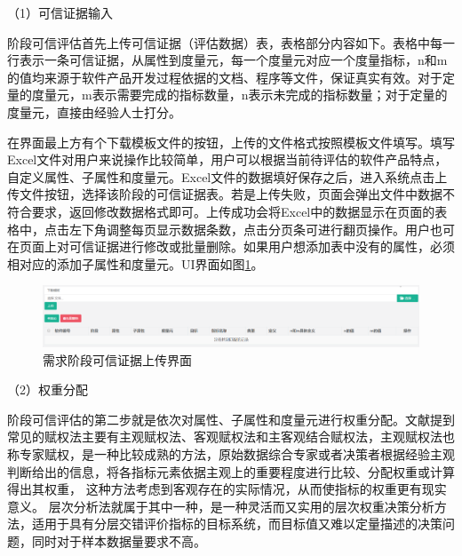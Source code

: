 （1）可信证据输入

阶段可信评估首先上传可信证据（评估数据）表，表格部分内容如下。表格中每一行表示一条可信证据，从属性到度量元，每一个度量元对应一个度量指标，n和m的值均来源于软件产品开发过程依据的文档、程序等文件，保证真实有效。对于定量的度量元，m表示需要完成的指标数量，n表示未完成的指标数量；对于定量的度量元，直接由经验人士打分。

在界面最上方有个下载模板文件的按钮，上传的文件格式按照模板文件填写。填写Excel文件对用户来说操作比较简单，用户可以根据当前待评估的软件产品特点，自定义属性、子属性和度量元。Excel文件的数据填好保存之后，进入系统点击上传文件按钮，选择该阶段的可信证据表。若是上传失败，页面会弹出文件中数据不符合要求，返回修改数据格式即可。上传成功会将Excel中的数据显示在页面的表格中，点击左下角调整每页显示数据条数，点击分页条可进行翻页操作。用户也可在页面上对可信证据进行修改或批量删除。如果用户想添加表中没有的属性，必须相对应的添加子属性和度量元。UI界面如图\ref{fig:5_06}。

\begin{figure}[htb]
	\centering
	\includegraphics[width=13cm]{fig/5_06.png}
	\caption{需求阶段可信证据上传界面}
	\label{fig:5_06}
\end{figure}



（2）权重分配

阶段可信评估的第二步就是依次对属性、子属性和度量元进行权重分配。文献\cite{刘秋艳2017多要素评价中指标权重的确定方法评述}提到常见的赋权法主要有主观赋权法、客观赋权法和主客观结合赋权法，主观赋权法也称专家赋权，是一种比较成熟的方法，原始数据综合专家或者决策者根据经验主观判断给出的信息，将各指标元素依据主观上的重要程度进行比较、分配权重或计算得出其权重，
这种方法考虑到客观存在的实际情况，从而使指标的权重更有现实意义。
层次分析法就属于其中一种，是一种灵活而又实用的层次权重决策分析方法，适用于具有分层交错评价指标的目标系统，而目标值又难以定量描述的决策问题，同时对于样本数据量要求不高。


